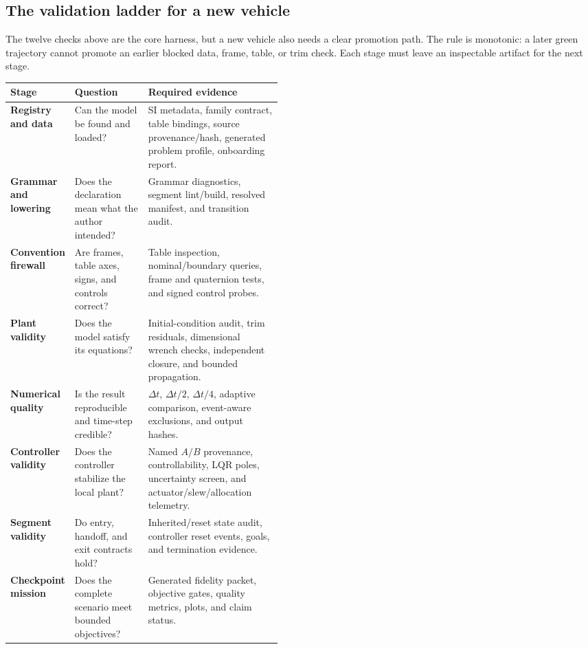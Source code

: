 \documentclass[11pt]{article}
\begin{document}
\subsection{The validation ladder for a new vehicle}

The twelve checks above are the core harness, but a new vehicle also needs a
clear promotion path. The rule is monotonic: a later green trajectory cannot
promote an earlier blocked data, frame, table, or trim check. Each stage must
leave an inspectable artifact for the next stage.

\begin{center}
\begin{tabularx}{0.96\linewidth}{>{\bfseries}p{0.19\linewidth}p{0.27\linewidth}Y}
\toprule
Stage & Question & Required evidence \\
\midrule
Registry and data & Can the model be found and loaded? & SI metadata, family contract, table bindings, source provenance/hash, generated problem profile, onboarding report. \\
Grammar and lowering & Does the declaration mean what the author intended? & Grammar diagnostics, segment lint/build, resolved manifest, and transition audit. \\
Convention firewall & Are frames, table axes, signs, and controls correct? & Table inspection, nominal/boundary queries, frame and quaternion tests, and signed control probes. \\
Plant validity & Does the model satisfy its equations? & Initial-condition audit, trim residuals, dimensional wrench checks, independent closure, and bounded propagation. \\
Numerical quality & Is the result reproducible and time-step credible? & $\Delta t$, $\Delta t/2$, $\Delta t/4$, adaptive comparison, event-aware exclusions, and output hashes. \\
Controller validity & Does the controller stabilize the local plant? & Named $A/B$ provenance, controllability, LQR poles, uncertainty screen, and actuator/slew/allocation telemetry. \\
Segment validity & Do entry, handoff, and exit contracts hold? & Inherited/reset state audit, controller reset events, goals, and termination evidence. \\
Checkpoint mission & Does the complete scenario meet bounded objectives? & Generated fidelity packet, objective gates, quality metrics, plots, and claim status. \\
\bottomrule
\end{tabularx}
\end{center}
\end{document}
